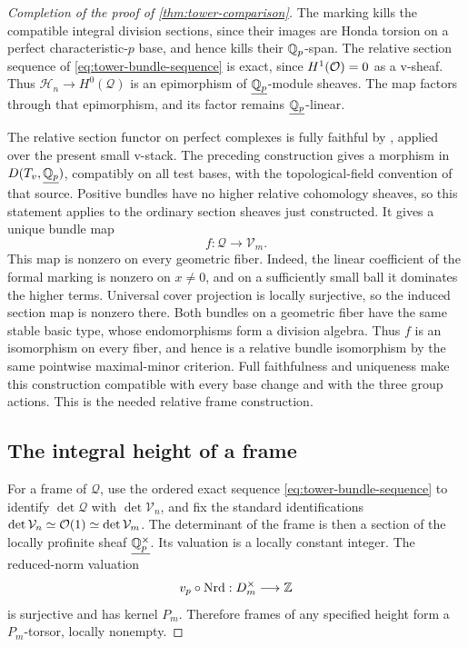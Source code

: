 \begin{proof}[Completion of the proof of \cref{thm:tower-comparison}]
The marking kills the compatible integral division sections, since
their images are Honda torsion on a perfect characteristic-$p$ base,
and hence kills their $\mathbb Q_p$-span. The relative section sequence of
\eqref{eq:tower-bundle-sequence} is exact, since
$H^1(\mathcal O)=0$ as a v-sheaf. Thus
$\mathcal H_n\to H^0(\mathcal Q)$ is an epimorphism of
$\underline{\mathbb Q_p}$-module sheaves. The map factors through that
epimorphism, and its factor remains $\underline{\mathbb Q_p}$-linear.

The relative section functor on perfect complexes is fully faithful
by \cite[Corollary 3.11, pp. 3680--3681]{anschutzLeBras2025},
applied over the present small v-stack. The preceding construction
gives a morphism in $D(T_v,\underline{\mathbb Q_p})$, compatibly on all test
bases, with the topological-field convention of that source.
Positive bundles have no
higher relative cohomology sheaves, so this statement applies to
the ordinary section sheaves just constructed. It gives a unique
bundle map
\[
 f:\mathcal Q\longrightarrow\mathcal V_m.
\]
This map is nonzero on every geometric fiber. Indeed, the linear
coefficient of the formal marking is nonzero on $x\ne0$, and on a
sufficiently small ball it dominates the higher terms. Universal
cover projection is locally surjective, so the induced section map
is nonzero there. Both bundles on a geometric fiber have the same
stable basic type, whose endomorphisms form a division algebra.
Thus $f$ is an isomorphism on every fiber, and hence is a relative
bundle isomorphism by the same pointwise maximal-minor criterion.
Full faithfulness and uniqueness make this
construction compatible with every base change and with the three
group actions. This is the needed relative frame construction.

\subsection{The integral height of a frame}

For a frame of $\mathcal Q$, use the ordered exact sequence
\eqref{eq:tower-bundle-sequence} to identify
$\det\mathcal Q$ with $\det\mathcal V_n$, and fix the standard
identifications
$\det\mathcal V_n\simeq\mathcal O(1)\simeq\det\mathcal V_m$.
The determinant of the frame is then a section of the locally
profinite sheaf $\underline{\mathbb Q_p^{\times}}$. Its valuation is a
locally constant integer. The reduced-norm valuation
\[
 v_p\circ\operatorname{Nrd}:D_m^{\times}\longrightarrow\mathbb Z
\]
is surjective and has kernel $P_m$. Therefore frames of any specified
height form a $P_m$-torsor, locally nonempty.


\end{proof}
